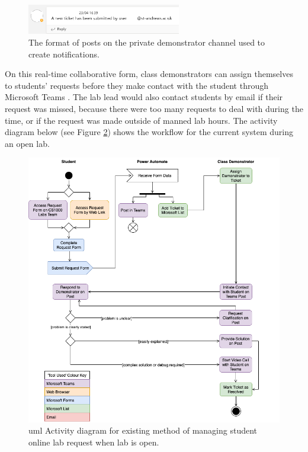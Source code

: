 \FloatBarrier
\begin{figure}[H]
  \centering
  \includegraphics[width=0.6\textwidth]{2context/images/teams2b.png}
  \caption{The format of posts on the private demonstrator channel used to create notifications.}
  \label{fig:privteam}
\end{figure}

On this real-time collaborative form, class demonstrators can assign themselves to students' requests before they make contact with the student through Microsoft Teams \cite{teams}. The lab lead would also contact students by email if their request was missed, because there were too many requests to deal with during the time, or if the request was made outside of manned lab hours. The activity diagram below (see Figure \ref{fig:activdiagram}) shows the workflow for the current system during an open lab.

\FloatBarrier
\begin{figure}[H]
  \centering
  \includegraphics[width=\textwidth]{2context/images/activityRevised.png}
  \caption{\gls{uml} Activity diagram for existing method of managing student online lab request when lab is open.}
  \label{fig:activdiagram}
\end{figure}

